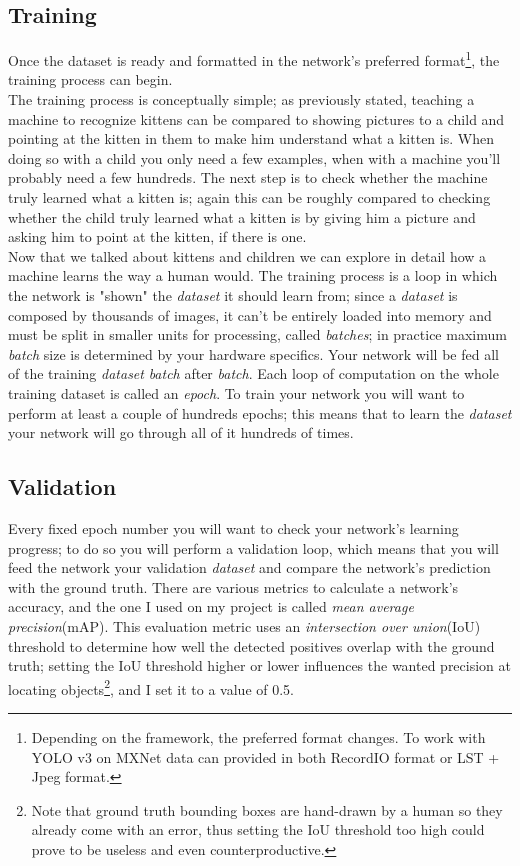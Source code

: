 	\subsection{Training}
	Once the dataset is ready and formatted in the network's preferred format\footnote{Depending on the framework, the preferred format changes. To work with YOLO v3 on MXNet data can provided in both RecordIO format or LST + Jpeg format.}, the training process can begin. \\
	The training process is conceptually simple; as previously stated, teaching a machine to recognize kittens can be compared to showing pictures to a child and pointing at the kitten in them to make him understand what a kitten is. When doing so with a child you only need a few examples, when with a machine you'll probably need a few hundreds. The next step is to check whether the machine truly learned what a kitten is; again this can be roughly compared to checking whether the child truly learned what a kitten is by giving him a picture and asking him to point at the kitten, if there is one. \\
	Now that we talked about kittens and children we can explore in detail how a machine learns the way a human would.
	The training process is a loop in which the network is "shown" the \emph{dataset} it should learn from; since a \emph{dataset} is composed by thousands of images, it can't be entirely loaded into memory and must be split in smaller units for processing, called \emph{batches}; in practice maximum \emph{batch} size is determined by your hardware specifics. Your network will be fed all of the training \emph{dataset} \emph{batch} after \emph{batch}. Each loop of computation on the whole training dataset is called an \emph{\gls{epoch}}\glsfirstoccur. To train your network you will want to perform at least a couple of hundreds epochs; this means that to learn the \emph{dataset} your network will go through all of it hundreds of times. 

	\subsection{Validation}	
	Every fixed epoch number you will want to check your network's learning progress; to do so you will perform a validation loop, which means that you will feed the network your validation \emph{dataset} and compare the network's prediction with the ground truth. There are various metrics to calculate a network's accuracy, and the one I used on my project is called \emph{\gls{mean average precision}}\glsfirstoccur (mAP). This evaluation metric uses an \emph{\gls{intersection over union}}\glsfirstoccur (IoU) threshold to determine how well the detected positives overlap with the ground truth; setting the IoU threshold higher or lower influences the wanted precision at locating objects\footnote{Note that ground truth bounding boxes are hand-drawn by a human so they already come with an error, thus setting the IoU threshold too high could prove to be useless and even counterproductive.}, and I set it to a value of 0.5.
	
